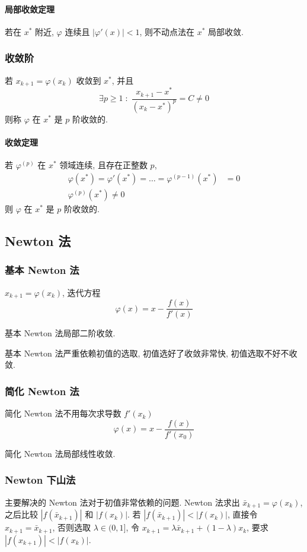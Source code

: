 \documentclass{ctexart}
\begin{document}
\paragraph{局部收敛定理}
    若在 $x^*$ 附近, $\varphi$ 连续且 $|\varphi'(x)| < 1$, 则不动点法在 $x^*$ 局部收敛.
\subsubsection{收敛阶}
    若 $x_{k+1} = \varphi(x_k)$ 收敛到 $x^*$, 并且 \[
        \exists p \ge 1\;:\;\frac{x_{k+1} - x^*}{(x_k - x^*)^p} = C \neq 0\]
    则称 $\varphi$ 在 $x^*$ 是 $p$ 阶收敛的.
\paragraph{收敛定理}
    若 $\varphi^{(p)}$ 在 $x^*$ 领域连续, 且存在正整数 $p$, \begin{align*}
        \varphi(x^*) = \varphi'(x^*) = \ldots = \varphi^{(p-1)}(x^*) &= 0\\
        \varphi^{(p)}(x^*) \neq 0
    \end{align*}
    则 $\varphi$ 在 $x^*$ 是 $p$ 阶收敛的.


\subsection{Newton 法}
\subsubsection{基本 Newton 法}
    $x_{k+1} = \varphi(x_k)$, 迭代方程 \[
        \varphi(x) = x - \frac{f(x)}{f'(x)}\]
    \par
    基本 Newton 法局部二阶收敛.\par
    基本 Newton 法严重依赖初值的选取, 初值选好了收敛非常快, 初值选取不好不收敛.
\subsubsection{简化 Newton 法}
    简化 Newton 法不用每次求导数 $f'(x_k)$\[
        \varphi(x) = x - \frac{f(x)}{f'(x_0)}\]
    \par
    简化 Newton 法局部线性收敛.\par
\subsubsection{Newton 下山法}
    主要解决的 Newton 法对于初值非常依赖的问题.
    Newton 法求出 $\bar{x}_{k+1} = \varphi(x_k)$,
    之后比较 $|f(\bar{x}_{k+1})|$ 和 $|f(x_k)|$.
    若 $|f(\bar{x}_{k+1})| < |f(x_k)|$, 直接令 $x_{k+1} = \bar{x}_{k+1}$,
    否则选取 $\lambda \in (0, 1]$,
    令 $x_{k+1} = \lambda \bar{x}_{k+1} + (1-\lambda) x_k$,
    要求 $|f(x_{k+1})| < |f(x_k)|$.
\end{document}
